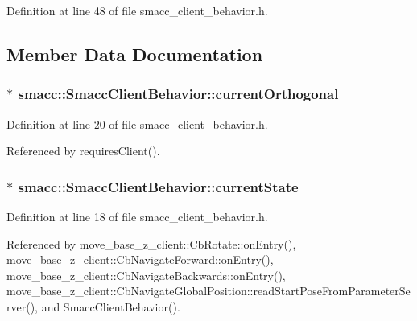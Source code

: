 Definition at line 48 of file smacc\+\_\+client\+\_\+behavior.\+h.



\subsection{Member Data Documentation}
\subsubsection[{\texorpdfstring{current\+Orthogonal}{currentOrthogonal}}]{$\ast$ smacc\+::\+Smacc\+Client\+Behavior\+::current\+Orthogonal}\hypertarget{classsmacc_1_1SmaccClientBehavior_a642742da14ffa20e323a03eefecfc8b2}{}\label{classsmacc_1_1SmaccClientBehavior_a642742da14ffa20e323a03eefecfc8b2}


Definition at line 20 of file smacc\+\_\+client\+\_\+behavior.\+h.



Referenced by requires\+Client().

\subsubsection[{\texorpdfstring{current\+State}{currentState}}]{$\ast$ smacc\+::\+Smacc\+Client\+Behavior\+::current\+State}\hypertarget{classsmacc_1_1SmaccClientBehavior_af76fc9b877542ed5caf033f820c107d0}{}\label{classsmacc_1_1SmaccClientBehavior_af76fc9b877542ed5caf033f820c107d0}


Definition at line 18 of file smacc\+\_\+client\+\_\+behavior.\+h.



Referenced by move\+\_\+base\+\_\+z\+\_\+client\+::\+Cb\+Rotate\+::on\+Entry(), move\+\_\+base\+\_\+z\+\_\+client\+::\+Cb\+Navigate\+Forward\+::on\+Entry(), move\+\_\+base\+\_\+z\+\_\+client\+::\+Cb\+Navigate\+Backwards\+::on\+Entry(), move\+\_\+base\+\_\+z\+\_\+client\+::\+Cb\+Navigate\+Global\+Position\+::read\+Start\+Pose\+From\+Parameter\+Server(), and Smacc\+Client\+Behavior().

